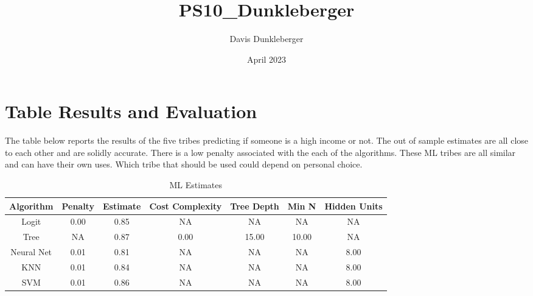 \documentclass{article}
\title{PS10\_Dunkleberger}
\author{Davis Dunkleberger}
\date{April 2023}
\begin{document}
\maketitle

\section{Table Results and Evaluation}
The table below reports the results of the five tribes predicting if someone is a high income or not. The out of sample estimates are all close to each other and are solidly accurate. There is a low penalty associated with the each of the algorithms. These ML tribes are all similar and can have their own uses. Which tribe that should be used could depend on personal choice. 

\begin{table}
    \centering
    \begin{tabular}{|c|c|c|c|c|c|c|}
         \hline Algorithm & Penalty & Estimate & Cost Complexity & Tree Depth & Min N & Hidden Units \\
         \hline Logit & 0.00 & 0.85 & NA & NA & NA & NA \\
         \hline Tree & NA & 0.87 & 0.00 & 15.00 & 10.00 & NA \\
         \hline Neural Net & 0.01 & 0.81 & NA & NA & NA & 8.00 \\
         \hline KNN & 0.01 & 0.84 & NA & NA & NA & 8.00 \\
         \hline SVM & 0.01 & 0.86 & NA & NA & NA & 8.00 \\
         \hline
    \end{tabular}
    \caption{ML Estimates}
    \label{tab:ML_Estimates}
\end{table}
\end{document}
